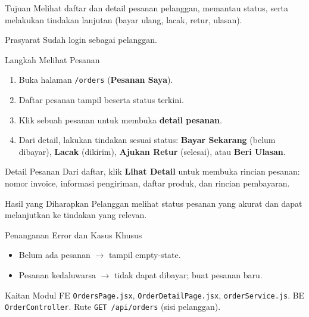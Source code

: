 
\begin{flowsection}{Tujuan}
Melihat daftar dan detail pesanan pelanggan, memantau status, serta melakukan
tindakan lanjutan (bayar ulang, lacak, retur, ulasan).
\end{flowsection}

\begin{flowsection}{Prasyarat}
Sudah login sebagai pelanggan.
\end{flowsection}

\begin{flowsection}{Langkah Melihat Pesanan}
\begin{enumerate}
  \item Buka halaman \texttt{/orders} (\textbf{Pesanan Saya}).
  \item Daftar pesanan tampil beserta status terkini.
  \item Klik sebuah pesanan untuk membuka \textbf{detail pesanan}.
  \item Dari detail, lakukan tindakan sesuai status: \textbf{Bayar Sekarang}
        (belum dibayar), \textbf{Lacak} (dikirim), \textbf{Ajukan Retur} (selesai),
        atau \textbf{Beri Ulasan}.
\end{enumerate}
\end{flowsection}


\begin{flowsection}{Detail Pesanan}
Dari daftar, klik \textbf{Lihat Detail} untuk membuka rincian pesanan: nomor
invoice, informasi pengiriman, daftar produk, dan rincian pembayaran.
\end{flowsection}


\begin{flowsection}{Hasil yang Diharapkan}
Pelanggan melihat status pesanan yang akurat dan dapat melanjutkan ke tindakan
yang relevan.
\end{flowsection}

\begin{flowsection}{Penanganan Error dan Kasus Khusus}
\begin{itemize}
  \item Belum ada pesanan $\rightarrow$ tampil empty-state.
  \item Pesanan kedaluwarsa $\rightarrow$ tidak dapat dibayar; buat pesanan baru.
\end{itemize}
\end{flowsection}

\begin{flowsection}{Kaitan Modul}
FE \texttt{OrdersPage.jsx}, \texttt{OrderDetailPage.jsx}, \texttt{orderService.js}.
BE \texttt{OrderController}. Rute \texttt{GET /api/orders} (sisi pelanggan).
\end{flowsection}

